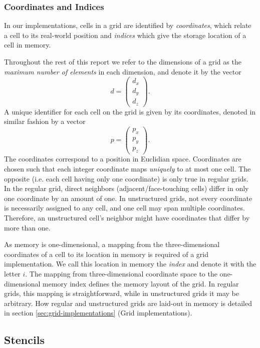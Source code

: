 \subsubsection{Coordinates and Indices}

In our implementations, cells in a grid are identified by \emph{coordinates}, which relate a cell to its real-world position and \emph{indices} which give the storage location of a cell in memory. 

Throughout the rest of this report we refer to the dimensions of a grid as the \emph{maximum number of elements} in each dimension, and denote it by the vector
$$d = \begin{pmatrix}d_x \\ d_y \\ d_z\end{pmatrix}.$$
A unique identifier for each cell on the grid is given by its coordinates, denoted in similar fashion by a vector
$$p = \begin{pmatrix}p_x \\ p_y \\ p_z\end{pmatrix}.$$
The coordinates correspond to a position in Euclidian space. Coordinates are chosen such that each integer coordinate maps \emph{uniquely} to at most one cell. The opposite (i.e. each cell having only one coordinate) is only true in regular grids. In the regular grid, direct neighbors (adjacent/face-touching cells) differ in only one coordinate by an amount of one. In unstructured grids, not every coordinate is necessarily assigned to any cell, and one cell may span multiple coordinates. Therefore, an unstructured cell's neighbor might have coordinates that differ by more than one.

As memory is one-dimensional, a mapping from the three-dimensional coordinates of a cell to its location in memory is required of a grid implementation. We call this location in memory the \emph{index} and denote it with the letter $i$. The mapping from three-dimensional coordinate space to the one-dimensional memory index defines the memory layout of the grid. In regular grids, this mapping is straightforward, while in unstructured grids it may be arbitrary. How regular and unstructured grids are laid-out in memory is detailed in section \ref{sec:grid-implementations} (Grid implementations).

\subsection{Stencils}									\label{sec:stencils}

